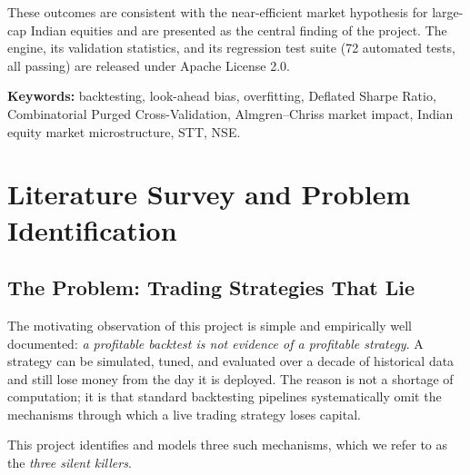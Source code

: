 \documentclass[12pt,a4paper,oneside]{report}
\begin{document}
These outcomes are consistent with the near-efficient market hypothesis for
large-cap Indian equities and are presented as the central finding of the
project. The engine, its validation statistics, and its regression test suite
(72 automated tests, all passing) are released under Apache License 2.0.

\textbf{Keywords:} backtesting, look-ahead bias, overfitting, Deflated Sharpe
Ratio, Combinatorial Purged Cross-Validation, Almgren--Chriss market impact,
Indian equity market microstructure, STT, NSE.

\clearpage
\tableofcontents
\clearpage
\listoffigures
\clearpage
\listoftables
\clearpage
{}

\chapter{Literature Survey and Problem Identification}

\section{The Problem: Trading Strategies That Lie}

The motivating observation of this project is simple and empirically well
documented: \emph{a profitable backtest is not evidence of a profitable strategy}.
A strategy can be simulated, tuned, and evaluated over a decade of historical data
and still lose money from the day it is deployed. The reason is not a shortage of
computation; it is that standard backtesting pipelines systematically omit the
mechanisms through which a live trading strategy loses capital.

This project identifies and models three such mechanisms, which we refer to as
the \emph{three silent killers}.
\end{document}
